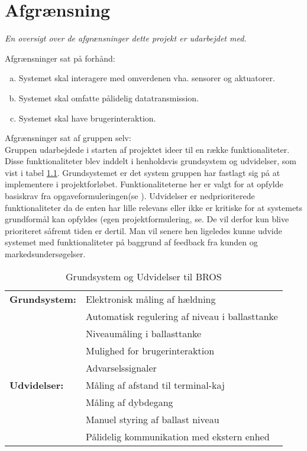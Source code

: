 \chapter{Afgrænsning}
\textit{En oversigt over de afgrænsninger dette projekt er udarbejdet med.}

Afgrænsninger sat på forhånd:
\begin{enumerate}[a.]
\item Systemet skal interagere med omverdenen vha. sensorer og aktuatorer.
\item Systemet skal omfatte pålidelig datatransmission.
\item Systemet skal have brugerinteraktion.
\end{enumerate}
Afgrænsninger sat af gruppen selv:\\
Gruppen udarbejdede i starten af projektet ideer til en række funktionaliteter. Disse funktionaliteter blev inddelt i henholdsvis grundsystem og udvidelser, som vist i tabel \ref{tabel:Grundogudvid}.
Grundsystemet er det system gruppen har fastlagt sig på at implementere i projektforløbet. Funktionaliteterne her er valgt for at opfylde basiskrav fra opgaveformuleringen(se ).
Udvidelser er nedprioriterede funktionaliteter da de enten har lille relevans eller ikke er kritiske for at systemets grundformål kan opfyldes (egen projektformulering, se. De vil derfor kun blive prioriteret såfremt tiden er dertil. 
Man vil senere hen ligeledes kunne udvide systemet med funktionaliteter på baggrund af feedback fra kunden og markedsundersøgelser.

\begin{table}[H]
\centering
\begin{tabular}{|l|l|}
\hline
\textbf{Grundsystem:} &Elektronisk måling af hældning\\
 &Automatisk regulering af niveau i ballasttanke\\
 &Niveaumåling i ballasttanke\\
 &Mulighed for brugerinteraktion\\
 &Advarselssignaler\\\hline
\textbf{Udvidelser:} &Måling af afstand til terminal-kaj\\
 &Måling af dybdegang\\
 &Manuel styring af ballast niveau\\
 &Pålidelig kommunikation med ekstern enhed\\\hline
\end{tabular}
\caption{Grundsystem og Udvidelser til BROS}
\label{tabel:Grundogudvid}
\end{table}